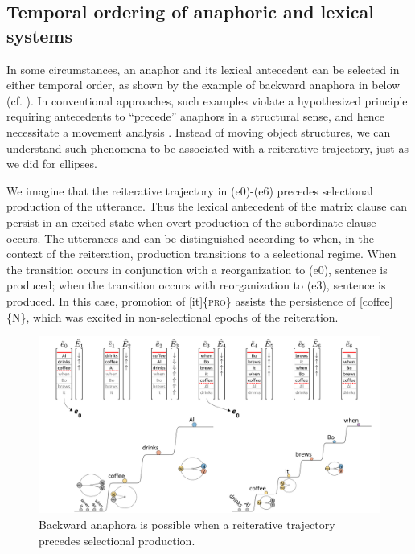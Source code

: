 \subsection{Temporal ordering of anaphoric and lexical systems}

In some circumstances, an anaphor and its lexical antecedent can be selected in either temporal order, as shown by the example of backward anaphora in  below (cf. \citealt{KazaninaEtAl2007,ReulandAvrutin2005}). In conventional approaches, such examples violate a hypothesized principle requiring antecedents to “precede” anaphors in a structural sense, and hence necessitate a movement analysis \citep{Chomsky1993}. Instead of moving object structures, we can understand such phenomena to be associated with a reiterative trajectory, just as we did for ellipses.

  We imagine that the reiterative trajectory in {} (e0)-(e6) precedes selectional production of the utterance. Thus the lexical antecedent of the matrix clause can persist in an excited state when overt production of the subordinate clause occurs. The utterances  and  can be distinguished according to when, in the context of the reiteration, production transitions to a selectional regime. When the transition occurs in conjunction with a reorganization to (e0), sentence  is produced; when the transition occurs with reorganization to (e3), sentence  is produced. In this case, promotion of [it]\{\textsc{pro}\} assists the persistence of [coffee]\{N\}, which was excited in non-selectional epochs of the reiteration.

\ea\label{ex:7:1}
\z
\z
  
\begin{figure}
\includegraphics[width=\textwidth]{figures/Tilsen-img154.png}
\caption{Backward anaphora is possible when a reiterative trajectory precedes selectional production.}
\label{fig:7:10}
\end{figure}
 


